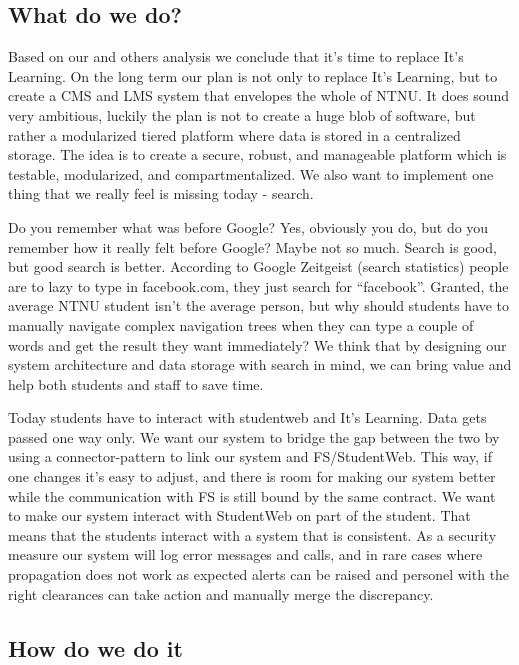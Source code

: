 \subsection{What do we do?}
Based on our and others analysis we conclude that it's time to replace It's Learning. On the long term our plan is not only to replace It's Learning, but to create
a CMS and LMS system that envelopes the whole of NTNU. It does sound very ambitious, luckily the plan is not to create a huge blob of software, but rather a modularized tiered 
platform where data is stored in a centralized storage. The idea is to create a secure, robust, and manageable platform which is testable, modularized, and compartmentalized.
We also want to implement one thing that we really feel is missing today - search. 

\noindent
Do you remember what was before Google? Yes, obviously you do, but do you remember how it really felt before Google? Maybe not so much. Search is good, but good search is better.
According to Google Zeitgeist (search statistics) \cite{google:zeitgeist} people are to lazy to type in facebook.com, they just search for ``facebook''. Granted, the average NTNU 
student isn't the average person, but why should students have to manually navigate complex navigation trees when they can type a couple of words and get the result they want 
immediately? We think that by designing our system architecture and data storage with search in mind, we can bring value and help both students and staff to save time. 

\noindent
Today students have to interact with studentweb and It's Learning. Data gets passed one way only. We want our system to bridge the gap between the two by using a 
connector-pattern %
to link our system and FS/StudentWeb. This way, if one changes it's easy to adjust, and there is room for making our system better while the communication with FS is still bound by 
the same contract. We want to make our system interact with StudentWeb on part of the student. That means that the students interact with a system that is consistent. As a security 
measure our system will log error messages and calls, and in rare cases where propagation does not work as expected alerts can be raised and personel with the right clearances can 
take action and manually merge the discrepancy. %

\subsection{How do we do it}

